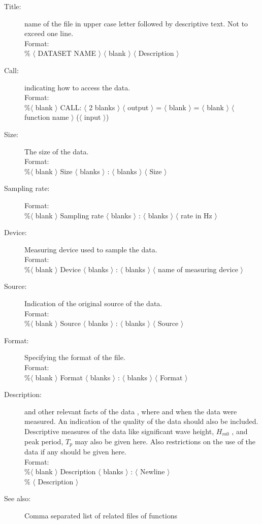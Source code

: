 \documentclass[10pt,a4paper]{article}   %
\begin{document}
\begin{description}
\item[Title:] name of the file in upper case letter followed by descriptive text. 
Not to exceed one line. \\
 Format: \\
\%  $\langle$ DATASET NAME $\rangle $
  $\langle$ blank $\rangle $ $\langle$ Description $\rangle $
\item[Call:] indicating how to access the data.\\
  Format:\\
 \%$\langle$ blank $\rangle $ CALL: $\langle$ 2 blanks $\rangle$
  $\langle$ output $\rangle $ = $\langle$ blank $\rangle $ = $\langle$ blank $\rangle$
  $\langle$ function name $\rangle$ ($\langle$ input $\rangle$)
\item[Size:] The size of the data.\\
Format:\\
\%$\langle$ blank $\rangle $ Size $\langle$  blanks $\rangle$
  : $\langle$ blanks $\rangle $   $\langle$ Size  $\rangle$
\item[Sampling rate:] 
Format:\\
\%$\langle$ blank $\rangle $ Sampling rate $\langle$  blanks $\rangle$
  : $\langle$ blanks $\rangle $   $\langle$ rate in Hz  $\rangle$
\item[Device:] Measuring device used to sample the data. \\
Format:\\
\%$\langle$ blank $\rangle $ Device $\langle$  blanks $\rangle$
  : $\langle$ blanks $\rangle $   $\langle$ name of measuring device $\rangle$
\item[Source:] Indication of the original source of the data.\\
Format:\\
\%$\langle$ blank $\rangle $ Source $\langle$  blanks $\rangle$
  : $\langle$ blanks $\rangle $   $\langle$ Source  $\rangle$
\item[Format:] Specifying the format of the file.\\
Format:\\
\%$\langle$ blank $\rangle $ Format $\langle$  blanks $\rangle$
  : $\langle$ blanks $\rangle $   $\langle$ Format  $\rangle$
 \item[Description:] and other relevant facts of the data , \ie{} where and when the 
data were measured. An indication of the quality of the data should also be included. 
Descriptive measures of the data like significant 
wave height, $H_{m0}$ , and peak period, $T_{p}$ may also be given here.  
Also restrictions on the use of the data 
if any should be given here. \\
Format:\\
\%$\langle$ blank $\rangle $ Description $\langle$  blanks $\rangle$
  :  $\langle$ Newline $\rangle $ \\
\%  $\langle$ Description  $\rangle$
\item[See also:] Comma separated list of related files of functions 
\end{description}
\end{document}
